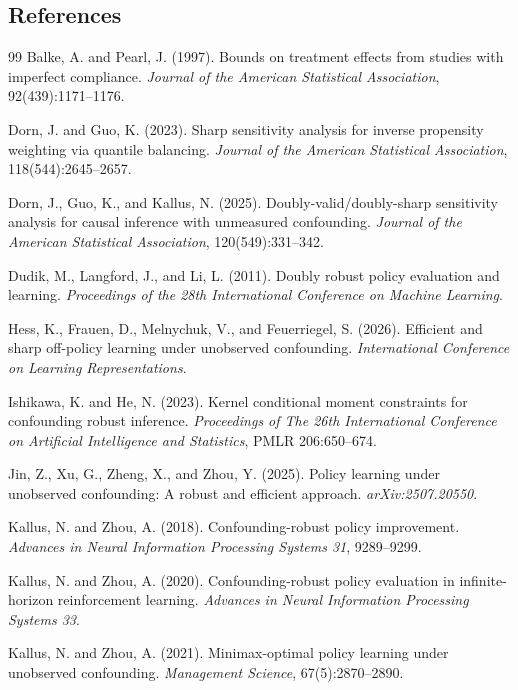\documentclass[11pt]{article}
\theoremstyle{definition}
\theoremstyle{plain}
\theoremstyle{remark}
\begin{document}
\subsection*{References}
\begin{thebibliography}{99}
Balke, A. and Pearl, J. (1997).
Bounds on treatment effects from studies with imperfect compliance.
\emph{Journal of the American Statistical Association}, 92(439):1171--1176.

Dorn, J. and Guo, K. (2023).
Sharp sensitivity analysis for inverse propensity weighting via quantile balancing.
\emph{Journal of the American Statistical Association}, 118(544):2645--2657.

Dorn, J., Guo, K., and Kallus, N. (2025).
Doubly-valid/doubly-sharp sensitivity analysis for causal inference with unmeasured confounding.
\emph{Journal of the American Statistical Association}, 120(549):331--342.

Dudik, M., Langford, J., and Li, L. (2011).
Doubly robust policy evaluation and learning.
\emph{Proceedings of the 28th International Conference on Machine Learning}.

Hess, K., Frauen, D., Melnychuk, V., and Feuerriegel, S. (2026).
Efficient and sharp off-policy learning under unobserved confounding.
\emph{International Conference on Learning Representations}.

Ishikawa, K. and He, N. (2023).
Kernel conditional moment constraints for confounding robust inference.
\emph{Proceedings of The 26th International Conference on Artificial
Intelligence and Statistics}, PMLR 206:650--674.

Jin, Z., Xu, G., Zheng, X., and Zhou, Y. (2025).
Policy learning under unobserved confounding: A robust and efficient approach.
\emph{arXiv:2507.20550}.

Kallus, N. and Zhou, A. (2018).
Confounding-robust policy improvement.
\emph{Advances in Neural Information Processing Systems 31}, 9289--9299.

Kallus, N. and Zhou, A. (2020).
Confounding-robust policy evaluation in infinite-horizon reinforcement learning.
\emph{Advances in Neural Information Processing Systems 33}.

Kallus, N. and Zhou, A. (2021).
Minimax-optimal policy learning under unobserved confounding.
\emph{Management Science}, 67(5):2870--2890.


\end{thebibliography}
\end{document}
